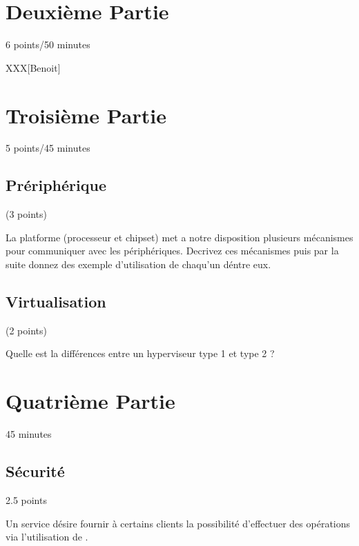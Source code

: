%
%

\section{Deuxi\`eme Partie}
{\hfill{} \scriptsize{6 points/50 minutes}}

XXX[Benoit]

%
%

\section{Troisi\`eme Partie}
{\hfill{} \scriptsize{5 points/45 minutes}}

\subsection{Pr\'eriph\'erique} (3 points)

La platforme (processeur et chipset) met a notre disposition plusieurs
m\'ecanismes pour communiquer avec les p\'eriph\'eriques. Decrivez ces
m\'ecanismes puis par la suite donnez des exemple d'utilisation de
chaqu'un d\'entre eux.

\begin{correction}
\end{correction}

\subsection{Virtualisation} (2 points)

Quelle est la diff\'erences entre un hyperviseur type 1 et type 2 ?

\begin{correction}
\end{correction}

%
%

\section{Quatri\`eme Partie}
{\hfill{} \scriptsize{45 minutes}}

%
%
\subsection{S\'ecurit\'e}
{\hfill{} \scriptsize{2.5 points}}

Un service d\'esire fournir \`a certains clients la possibilit\'e
d'effectuer des op\'erations via l'utilisation de .

